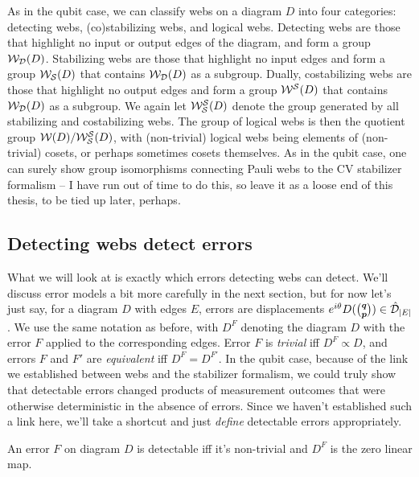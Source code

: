 As in the qubit case, we can classify webs on a diagram $D$ into four categories: detecting webs, (co)stabilizing webs, and logical webs.
Detecting webs are those that highlight no input or output edges of the diagram, and form a group $\mathcal{W}_{\mathcal{D}}(D)$.
Stabilizing webs are those that highlight no input edges and form a group $\mathcal{W}_{\mathcal{S}}(D)$ that contains $\mathcal{W}_{\mathcal{D}}(D)$ as a subgroup.
Dually, costabilizing webs are those that highlight no output edges and form a group $\mathcal{W}^{\mathcal{S}}(D)$ that contains $\mathcal{W}_{\mathcal{D}}(D)$ as a subgroup.
We again let $\mathcal{W}_{\mathcal{S}}^{\mathcal{S}}(D)$ denote the group generated by all stabilizing and costabilizing webs.
The group of logical webs is then the quotient group $\mathcal{W}(D)/\mathcal{W}_{\mathcal{S}}^{\mathcal{S}}(D)$, with (non-trivial) logical webs being elements of (non-trivial) cosets, or perhaps sometimes cosets themselves.
As in the qubit case, one can surely show group isomorphisms connecting Pauli webs to the CV stabilizer formalism -- I have run out of time to do this, so leave it as a loose end of this thesis, to be tied up later, perhaps.

\subsection{Detecting webs detect errors}

What we will look at is exactly which errors detecting webs can detect.
We'll discuss error models a bit more carefully in the next section, but for now let's just say, for a diagram $D$ with edges $E$, errors are displacements $e^{i\theta}D(\binom{\boldsymbol{q}}{\boldsymbol{p}}) \in \hat{\mathcal{D}}_{|E|}$.
We use the same notation as before, with $D^F$ denoting the diagram $D$ with the error $F$ applied to the corresponding edges.
Error $F$ is \textit{trivial} iff $D^F \propto D$, and errors $F$ and $F'$ are \textit{equivalent} iff $D^F = D^{F'}$.
In the qubit case, because of the link we established between webs and the stabilizer formalism, we could truly show that detectable errors changed products of measurement outcomes that were otherwise deterministic in the absence of errors.
Since we haven't established such a link here, we'll take a shortcut and just \textit{define} detectable errors appropriately.

\begin{definition}\label{defn:detectable_error}
    An error $F$ on diagram $D$ is detectable iff it's non-trivial and $D^F$ is the zero linear map.
\end{definition}

